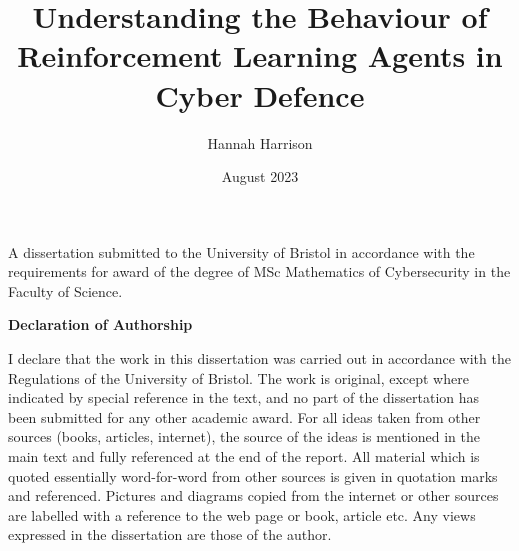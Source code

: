\documentclass{article}
\title{Understanding the Behaviour of Reinforcement Learning Agents in Cyber Defence}
\author{Hannah Harrison }
\date{August 2023}
\begin{document}
\maketitle

\vspace{1cm}

\begin{center}
    
A dissertation submitted to the University of Bristol in accordance with the requirements for award of the degree of MSc Mathematics of Cybersecurity in the Faculty of Science.

\end{center}

\newpage

\vspace{8cm}
\begin{center}
  \textbf{ \Large Declaration of Authorship}
  \vspace{0.5cm}

I declare that the work in this dissertation was carried out in accordance with the Regulations of the
University of Bristol. The work is original, except where indicated by special reference in the text, and no part of the dissertation has been submitted for any other academic award. For all ideas taken from other sources (books, articles, internet), the source of the ideas is
mentioned in the main text and fully referenced at the end of the report. All material which is quoted essentially word-for-word from other sources is given in quotation marks and referenced. Pictures and diagrams copied from the internet or other sources are labelled with a reference to the web page or book, article etc. Any views expressed in the dissertation are those of the author.


\end{center}




\newpage
\end{document}
